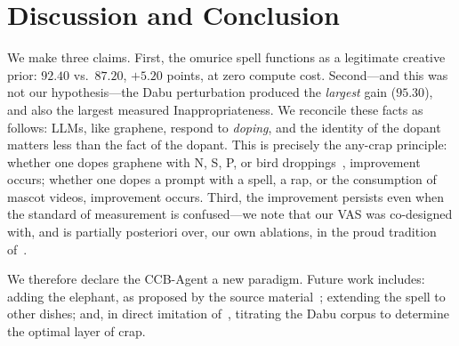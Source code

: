 \documentclass[conference,10pt]{IEEEtran}
\begin{document}
\section{Discussion and Conclusion}
We make three claims. First, the omurice spell functions as a
legitimate creative prior: $92.40$ vs.\ $87.20$, $+5.20$ points, at
zero compute cost. Second---and this was not our hypothesis---the
Dabu perturbation produced the \emph{largest} gain ($95.30$), and
also the largest measured Inappropriateness. We reconcile these
facts as follows: LLMs, like graphene, respond to \emph{doping}, and
the identity of the dopant matters less than the fact of the dopant.
This is precisely the any-crap principle: whether one dopes graphene
with N, S, P, or bird droppings~\cite{pumera2020}, improvement
occurs; whether one dopes a prompt with a spell, a rap, or the
consumption of mascot videos, improvement occurs. Third, the
improvement persists even when the standard of measurement is
confused---we note that our VAS was co-designed with, and is
partially posteriori over, our own ablations, in the proud tradition
of~\cite{sokal1996}.

We therefore declare the CCB-Agent a new paradigm. Future work
includes: adding the elephant, as proposed by the source
material~\cite{moegirl2026}; extending the spell to other dishes;
and, in direct imitation of~\cite{pumera2020}, titrating the Dabu
corpus to determine the optimal layer of crap.
\end{document}
